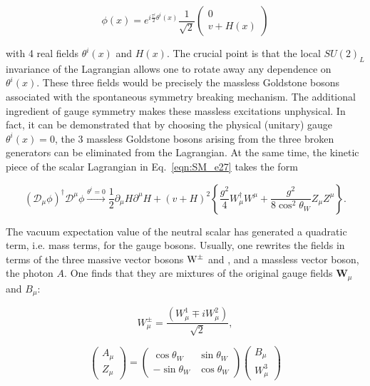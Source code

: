 \begin{equation}\label{eqn:SM_e30}
\phi(x) = e^{i\frac{\tau^i}{2}\theta^i(x)}\frac{1}{\sqrt{2}}
\begin{pmatrix}
  0 \\ v + H(x)
\end{pmatrix}
\end{equation}

\noindent with 4 real fields $\theta^i(x)$ and $H(x)$.
The crucial point is that the local $SU(2)_L$ invariance of the Lagrangian allows one to rotate away any dependence on $\theta^i(x)$.
These three fields would be precisely the massless Goldstone bosons associated with the spontaneous symmetry breaking mechanism.
The additional ingredient of gauge symmetry makes these massless excitations unphysical.
In fact, it can be demonstrated that by choosing the physical (unitary) gauge $\theta^i(x) = 0$, the 3 massless Goldstone bosons
arising from the three broken generators can be eliminated from the Lagrangian.
At the same time, the kinetic piece of the scalar Lagrangian in Eq.~\ref{eqn:SM_e27} takes the form

\begin{equation}\label{eqn:SM_e31}
(\mathcal{D}_\mu\phi)^\dag\mathcal{D}^\mu\phi \xrightarrow{\theta^i = 0} \frac{1}{2}\partial_\mu H\partial^\mu H + (v+H)^2 \left\{ \frac{g^2}{4}W^\dag_\mu W^\mu + \frac{g^2}{8\cos^2\theta_W}Z_\mu Z^\mu \right\}.
\end{equation}

The vacuum expectation value of the neutral scalar has generated a quadratic term, i.e. mass terms, for the gauge bosons.
Usually, one rewrites the fields in terms of the three massive vector bosons $\mathrm{W}^\pm$ and \PZ, and a massless vector boson, the photon $A$.
One finds that they are mixtures of the original gauge fields $\mathbf{W}_\mu$ and $B_\mu$:

\begin{equation}\label{eqn:SM_e32}
W^\pm_\mu = \frac{(W^1_\mu \mp iW^2_\mu)}{\sqrt{2}},
\end{equation}

\begin{equation}\label{eqn:SM_e33}
\begin{pmatrix}
  A_\mu \\ Z_\mu
\end{pmatrix}
=
\begin{pmatrix}
  \cos\theta_W & \sin\theta_W \\ -\sin\theta_W & \cos\theta_W
\end{pmatrix}
\begin{pmatrix}
  B_\mu \\ W^3_\mu
\end{pmatrix}
\end{equation}

